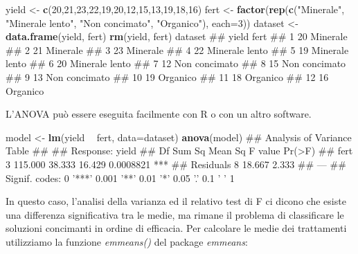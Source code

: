 \documentclass[a4paper,12pt,oneside]{book}
\newenvironment{Shaded}{\begin{snugshade}}{\end{snugshade}}
\newcommand{\KeywordTok}[1]{\textcolor[rgb]{0.13,0.29,0.53}{\textbf{#1}}}
\newcommand{\DataTypeTok}[1]{\textcolor[rgb]{0.13,0.29,0.53}{#1}}
\newcommand{\DecValTok}[1]{\textcolor[rgb]{0.00,0.00,0.81}{#1}}
\newcommand{\StringTok}[1]{\textcolor[rgb]{0.31,0.60,0.02}{#1}}
\newcommand{\OperatorTok}[1]{\textcolor[rgb]{0.81,0.36,0.00}{\textbf{#1}}}
\newcommand{\NormalTok}[1]{#1}
\theoremstyle{definition}
\theoremstyle{definition}
\theoremstyle{definition}
\theoremstyle{remark}
\begin{document}
\begin{Shaded}
\begin{Highlighting}[]
\NormalTok{yield <-}\StringTok{ }\KeywordTok{c}\NormalTok{(}\DecValTok{20}\NormalTok{,}\DecValTok{21}\NormalTok{,}\DecValTok{23}\NormalTok{,}\DecValTok{22}\NormalTok{,}\DecValTok{19}\NormalTok{,}\DecValTok{20}\NormalTok{,}\DecValTok{12}\NormalTok{,}\DecValTok{15}\NormalTok{,}\DecValTok{13}\NormalTok{,}\DecValTok{19}\NormalTok{,}\DecValTok{18}\NormalTok{,}\DecValTok{16}\NormalTok{)}
\NormalTok{fert <-}\StringTok{ }\KeywordTok{factor}\NormalTok{(}\KeywordTok{rep}\NormalTok{(}\KeywordTok{c}\NormalTok{(}\StringTok{"Minerale"}\NormalTok{, }\StringTok{"Minerale lento"}\NormalTok{, }
          \StringTok{"Non concimato"}\NormalTok{, }\StringTok{"Organico"}\NormalTok{), }\DataTypeTok{each=}\DecValTok{3}\NormalTok{))}
\NormalTok{dataset <-}\StringTok{ }\KeywordTok{data.frame}\NormalTok{(yield, fert)}
\KeywordTok{rm}\NormalTok{(yield, fert)}
\NormalTok{dataset}
\NormalTok{##    yield           fert}
\NormalTok{## 1     20       Minerale}
\NormalTok{## 2     21       Minerale}
\NormalTok{## 3     23       Minerale}
\NormalTok{## 4     22 Minerale lento}
\NormalTok{## 5     19 Minerale lento}
\NormalTok{## 6     20 Minerale lento}
\NormalTok{## 7     12  Non concimato}
\NormalTok{## 8     15  Non concimato}
\NormalTok{## 9     13  Non concimato}
\NormalTok{## 10    19       Organico}
\NormalTok{## 11    18       Organico}
\NormalTok{## 12    16       Organico}
\end{Highlighting}
\end{Shaded}

L'ANOVA può essere eseguita facilmente con R o con un altro software.

\begin{Shaded}
\begin{Highlighting}[]
\NormalTok{model <-}\StringTok{ }\KeywordTok{lm}\NormalTok{(yield }\OperatorTok{~}\StringTok{ }\NormalTok{fert, }\DataTypeTok{data=}\NormalTok{dataset)}
\KeywordTok{anova}\NormalTok{(model)}
\NormalTok{## Analysis of Variance Table}
\NormalTok{## }
\NormalTok{## Response: yield}
\NormalTok{##           Df  Sum Sq Mean Sq F value    Pr(>F)    }
\NormalTok{## fert       3 115.000  38.333  16.429 0.0008821 ***}
\NormalTok{## Residuals  8  18.667   2.333                      }
\NormalTok{## ---}
\NormalTok{## Signif. codes:  0 '***' 0.001 '**' 0.01 '*' 0.05 '.' 0.1 ' ' 1}
\end{Highlighting}
\end{Shaded}

In questo caso, l'analisi della varianza ed il relativo test di F ci
dicono che esiste una differenza significativa tra le medie, ma rimane
il problema di classificare le soluzioni concimanti in ordine di
efficacia. Per calcolare le medie dei trattamenti utilizziamo la
funzione \emph{emmeans()} del package \emph{emmeans}:
\end{document}
